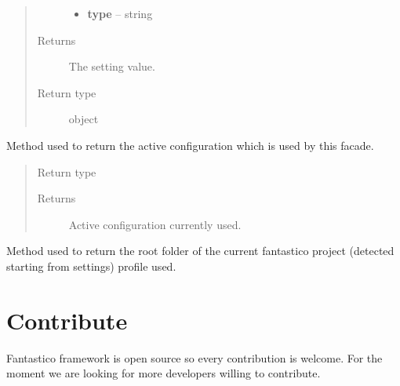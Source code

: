 \documentclass[letterpaper,10pt,english]{sphinxmanual}
\begin{document}
\begin{fulllineitems}
\begin{fulllineitems}
\begin{quote}
\begin{description}
\begin{itemize}
\item {} 
\textbf{type} -- string

\end{itemize}

\item[{Returns}] \leavevmode
The setting value.

\item[{Return type}] \leavevmode
object

\end{description}\end{quote}

\end{fulllineitems}


\begin{fulllineitems}
\label{get_started/settings:fantastico.settings.SettingsFacade.get_config}
Method used to return the active configuration which is used by this facade.
\begin{quote}\begin{description}
\item[{Return type}] \leavevmode
{\hyperref[get_started/settings:fantastico.settings.BasicSettings]{}}

\item[{Returns}] \leavevmode
Active configuration currently used.

\end{description}\end{quote}

\end{fulllineitems}


\begin{fulllineitems}
\label{get_started/settings:fantastico.settings.SettingsFacade.get_root_folder}
Method used to return the root folder of the current fantastico project (detected starting from settings)
profile used.

\end{fulllineitems}


\end{fulllineitems}



\section{Contribute}
\label{get_started/contribute:contribute}\label{get_started/contribute::doc}
Fantastico framework is open source so every contribution is welcome. For the moment we are looking for more developers willing to
contribute.
\end{document}
